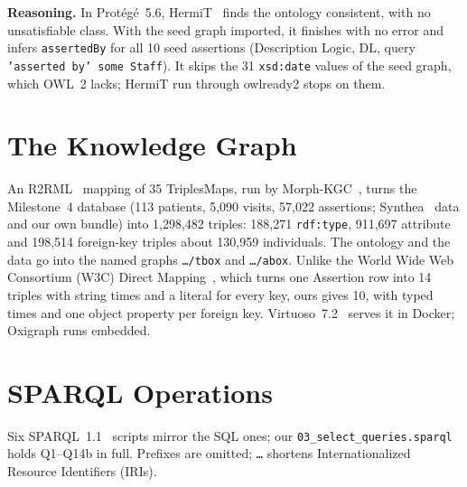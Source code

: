 \documentclass[sigconf]{acmart}
\newcommand{\tw}[1]{\texttt{#1}}
\begin{document}
\textbf{Reasoning.} In Protégé~5.6, HermiT~\cite{hermit} finds the ontology consistent, with no unsatisfiable class. With the seed graph imported, it finishes with no error and infers \tw{assertedBy} for all 10 seed assertions (Description Logic, DL, query \tw{'asserted by' some Staff}). It skips the 31 \tw{xsd:date} values of the seed graph, which OWL~2 lacks; HermiT run through owlready2 stops on them.

\section{The Knowledge Graph}\label{sec:kg}
An R2RML~\cite{r2rml} mapping of 35 TriplesMaps, run by Morph-KGC~\cite{morphkgc}, turns the Milestone~4 database (113 patients, 5,090 visits, 57,022 assertions; Synthea~\cite{synthea} data and our own bundle) into 1,298,482 triples: 188,271 \tw{rdf:type}, 911,697 attribute and 198,514 foreign-key triples about 130,959 individuals. The ontology and the data go into the named graphs \tw{\dots/tbox} and \tw{\dots/abox}. Unlike the World Wide Web Consortium (W3C) Direct Mapping~\cite{directmapping}, which turns one Assertion row into 14 triples with string times and a literal for every key, ours gives 10, with typed times and one object property per foreign key. Virtuoso~7.2~\cite{virtuoso} serves it in Docker; Oxigraph runs embedded.

\section{SPARQL Operations}\label{sec:ops}
Six SPARQL~1.1~\cite{sparql11} scripts mirror the SQL ones; our \tw{03\_\allowbreak select\_\allowbreak queries.sparql} holds Q1--Q14b in full. Prefixes are omitted; \tw{\dots} shortens Internationalized Resource Identifiers (IRIs).
\end{document}
